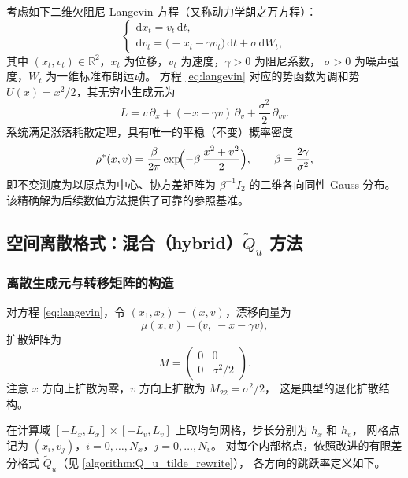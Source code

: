 	考虑如下二维欠阻尼 Langevin 方程（又称动力学朗之万方程）：
	\begin{equation}\label{eq:langevin}
		\begin{cases}
			\mathrm{d}x_t = v_t\,\mathrm{d}t, \\
			\mathrm{d}v_t = \bigl(-x_t - \gamma v_t\bigr)\,\mathrm{d}t + \sigma\,\mathrm{d}W_t,
		\end{cases}
	\end{equation}
	其中 $(x_t, v_t)\in\mathbb{R}^2$，$x_t$ 为位移，$v_t$ 为速度，$\gamma>0$ 为阻尼系数，
	$\sigma>0$ 为噪声强度，$W_t$ 为一维标准布朗运动。
	方程 \eqref{eq:langevin} 对应的势函数为调和势 $U(x) = x^2/2$，其无穷小生成元为
	\begin{equation}\label{eq:langevin-gen}
		L = v\,\partial_x + (-x - \gamma v)\,\partial_v
		+ \frac{\sigma^2}{2}\,\partial_{vv}.
	\end{equation}
	系统满足涨落耗散定理，具有唯一的平稳（不变）概率密度
	\begin{equation}\label{eq:langevin-true}
		\rho^*(x, v)
		= \frac{\beta}{2\pi}\exp\!\Bigl(-\beta\,\frac{x^2 + v^2}{2}\Bigr),
		\qquad \beta = \frac{2\gamma}{\sigma^2},
	\end{equation}
	即不变测度为以原点为中心、协方差矩阵为 $\beta^{-1} I_2$ 的二维各向同性 Gauss 分布。
	该精确解为后续数值方法提供了可靠的参照基准。
	
	\subsection{空间离散格式：混合（hybrid）$\widetilde{Q}_u$ 方法}
	
	\subsubsection{离散生成元与转移矩阵的构造}
	
	对方程 \eqref{eq:langevin}，令 $(x_1, x_2) = (x, v)$，漂移向量为
	\[
	\mu(x, v) = \bigl(v,\ -x - \gamma v\bigr),
	\]
	扩散矩阵为
	\[
	M = \begin{pmatrix} 0 & 0 \\ 0 & \sigma^2/2 \end{pmatrix}.
	\]
	注意 $x$ 方向上扩散为零，$v$ 方向上扩散为 $M_{22} = \sigma^2/2$，
	这是典型的退化扩散结构。
	
	在计算域 $[-L_x, L_x]\times[-L_v, L_v]$ 上取均匀网格，步长分别为 $h_x$ 和 $h_v$，
	网格点记为 $(x_i, v_j)$，$i = 0, \dots, N_x$，$j = 0, \dots, N_v$。
	对每个内部格点，依照改进的有限差分格式 $\widetilde{Q}_u$（见 \eqref{algorithm:Q_u_tilde_rewrite}），
	各方向的跳跃率定义如下。
	
